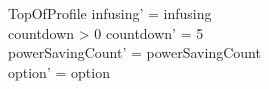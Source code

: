 \begin{schema}{TopOfProfile}
	infusing' = infusing\\
	countdown > 0 \land countdown' = 5\\
	powerSavingCount' = powerSavingCount\\ 
	option' = option\\
\end{schema}

